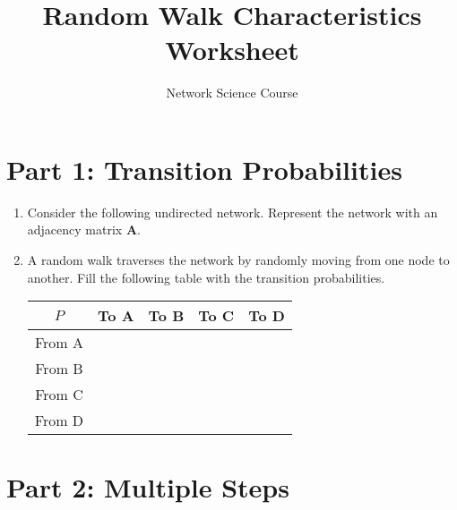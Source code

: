 \documentclass[a4paper, 14pt]{extarticle}
\title{Random Walk Characteristics Worksheet}
\author{Network Science Course}
\date{}
\begin{document}


\section*{Part 1: Transition Probabilities}

\begin{enumerate}
\item Consider the following undirected network. Represent the network with an adjacency matrix $\mathbf{A}$.

\begin{center}
\end{center}

\vspace{3cm}

\item A random walk traverses the network by randomly moving from one node to another. Fill the following table with the transition probabilities.

\begin{table}[h!]
\centering
\begin{tabular}{c|c|c|c|c}
$P$ & To A & To B & To C & To D \\
\hline
From A   & & & & \\[0.5cm]
\hline
From B   & & & & \\[0.5cm]
\hline
From C   & & & & \\[0.5cm]
\hline
From D   & & & & \\[0.5cm]
\hline
\end{tabular}
\label{tab:transition_matrix}
\end{table}

\end{enumerate}

\clearpage

\section*{Part 2: Multiple Steps}
\end{document}
